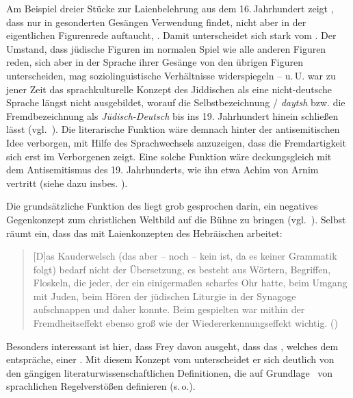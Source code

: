 Am Beispiel dreier Stücke zur Laienbelehrung aus dem 16.\,Jahrhundert zeigt \cite[186]{Frey1994}, dass \hai{{\LiHe}} nur in gesonderten Gesängen Verwendung findet, nicht aber in der eigentlichen Figurenrede auftaucht, . Damit unterscheidet sich \hai{{\LiHe}} stark vom \hai{{\LiJi}}. Der Umstand, dass jüdische Figuren im normalen Spiel wie alle anderen Figuren reden, sich aber in der Sprache ihrer Gesänge von den übrigen Figuren unterscheiden, mag soziolinguistische Verhältnisse widerspiegeln – u.\,U. war zu jener Zeit das sprachkulturelle Konzept des Jiddischen als eine nicht-deutsche Sprache längst nicht ausgebildet, worauf die Selbstbezeichnung 
 / \textit{daytsh} bzw. die Fremdbezeichnung als \textit{Jüdisch-Deutsch} bis ins 19. Jahrhundert hinein schließen lässt (vgl.\, \citealt{Simon1988}). Die literarische Funktion wäre demnach hinter der antisemitischen Idee verborgen, mit Hilfe des Sprachwechsels anzuzeigen, dass die Fremdartigkeit sich erst im Verborgenen zeigt. Eine solche Funktion wäre deckungsgleich mit dem Antisemitismus des 19. Jahrhunderts, wie ihn etwa Achim von Arnim vertritt (siehe dazu insbes. \citeyear[107–128]{Arnim2008}).

Die grundsätzliche Funktion des \hai{{\LiHe}} liegt grob gesprochen darin, ein negatives Gegenkonzept zum christlichen Weltbild auf die Bühne zu bringen (vgl.\, \citealt{Frey1992}). Selbst \cite[66–67]{Frey1992} räumt ein, dass das \hai{{\LiHe}} mit Laienkonzepten des Hebräischen arbeitet:

\begin{quote}
[D]as Kauderwelsch (das aber – noch – kein  ist, da es keiner Grammatik folgt) bedarf nicht der Übersetzung, es besteht aus Wörtern, Begriffen, Floskeln, die jeder, der ein einigermaßen scharfes Ohr hatte, beim Umgang mit Juden, beim Hören der jüdischen Liturgie in der Synagoge  aufschnappen und daher  konnte. Beim gespielten  war mithin der Fremdheitseffekt ebenso groß wie der Wiedererkennungseffekt wichtig. (\citealt[66–67]{Frey1992})
\end{quote} 

Besonders interessant ist hier, dass Frey davon ausgeht, dass das , welches dem \hai{{\LiJi}} entspräche, einer . Mit diesem Konzept vom \hai{{\LiJi}} unterscheidet er sich deutlich von den gängigen literaturwissenschaftlichen Definitionen, die \hai{{\LiJi}} auf Grundlage \,%
von sprachlichen Regelverstößen definieren (s.\,o.). 
 
